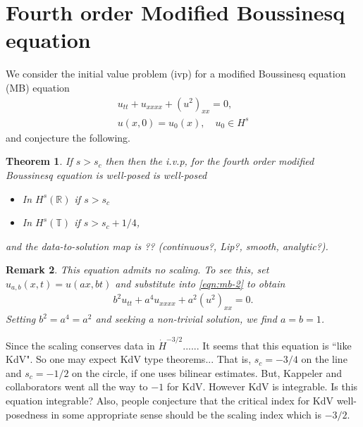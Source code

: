 \documentclass[12pt,reqno]{amsart}
\numberwithin{equation}{section}  %
\numberwithin{figure}{section}
\newcommand{\rr}{\mathbb{R}}
\newcommand{\ci}{\mathbb{T}}
\newtheorem{theorem}{Theorem}[section]
\newtheorem{remark}[theorem]{Remark}
\begin{document}
 
        \section{Fourth order Modified Boussinesq  equation}
        \label{sec:intro-2}
        We consider the initial value problem (ivp) for a modified Boussinesq
        equation (MB) equation 
        \begin{gather}
          u_{tt}   + u_{xxxx} + (u^2)_{xx} = 0,
          \label{eqn:mb-2}
          \\
          u(x,0) = u_{0}(x), \quad u_{0} \in H^{s}
          \label{eqn:mb-init-data-2}
        \end{gather}
        and conjecture the following.
        \begin{theorem}
        If $s>s_c$ then 
        then the  i.v.p, for the fourth order modified Boussinesq  equation  is well-posed
        is well-posed 
        \begin{itemize}
          \item In $H^s(\rr)$ if $s > s_c$
          \item In $H^{s}(\ci)$ if $s > s_c + 1/4$,
          \end{itemize}
          and the data-to-solution map is  ?? (continuous?, Lip?, smooth, analytic?). 
        \label{thm:wp-2}
        \end{theorem}
        
        \begin{remark}
          This equation admits no scaling. To see this, set $u_{a,b}(x,t) =
          u(ax,bt)$ and substitute into \eqref{eqn:mb-2} to obtain
          \begin{equation*}
          \begin{split}
            b^{2}u_{tt} + a^{4}u_{xxxx} + a^{2}(u^{2})_{xx} = 0.
          \end{split}
          \end{equation*}
          Setting $b^{2} = a^{4} = a^{2}$ and seeking a non-trivial solution, we
          find $a=b=1$. 
        \label{rem:scaling}
        \end{remark}
        Since the scaling conserves data in $\dot{H}^{-3/2}$......
        It seems that this equation is ``like KdV".
        So one may expect KdV type theorems...
        That is, $s_c=-3/4$ on the line and $s_c=-1/2$ on the circle,
        if one uses bilinear estimates.
        But, Kappeler and collaborators went all the way to $-1$ for KdV.
        However KdV is integrable. Is this equation integrable?
        Also, people conjecture that the critical index for KdV well-posedness 
        in some appropriate sense should be the scaling index which is  $-3/2$.
        
\end{document}
